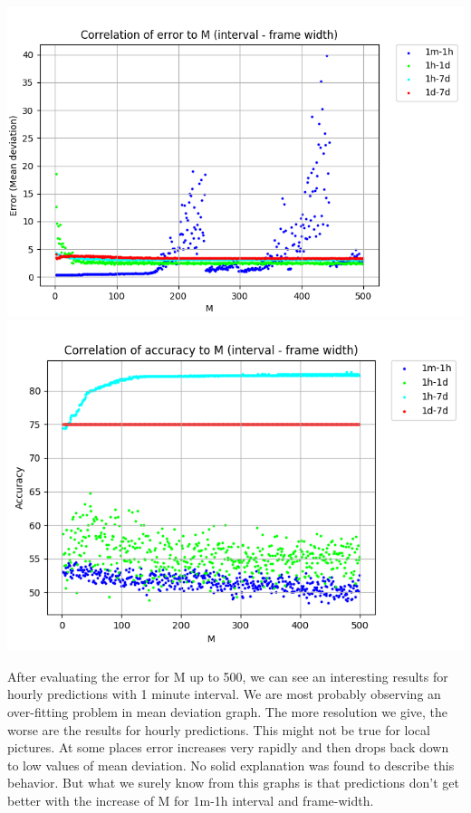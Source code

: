 \documentclass[a4paper,11pt,oneside]{article}
\begin{document}
  \begin{minipage}{\linewidth}
  \includegraphics[width=0.57\linewidth]{./data/PriceAndTweets/ErrorVsTweetsN_2to500.png}
  \includegraphics[width=0.53\linewidth]{./data/PriceAndTweets/AccuracyVsTweetsN_2to500.png}
  \label{pricesandtweetsupto500}
  \end{minipage}%
  \hfill
   
  After evaluating the error for M up to 500, we can see an interesting results for hourly predictions with 1 minute interval. We are most probably observing an over-fitting problem in mean deviation graph. The more resolution we give, the worse are the results for hourly predictions. This might not be true for local pictures. At some places error increases very rapidly and then drops back down to low values of mean deviation. No solid explanation was found to describe this behavior. But what we surely know from this graphs is that predictions don't get better with the increase of M for 1m-1h interval and frame-width. 
  
\end{document}
